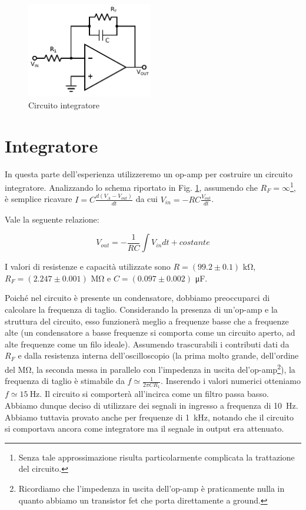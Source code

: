 \begin{figure}
	\includegraphics[width=55mm]{ccint.pdf}
	\caption{Circuito integratore}
	\label{fig:ccint}
\end{figure}

\section{Integratore}

In questa parte dell'esperienza utilizzeremo un op-amp per costruire un circuito integratore. Analizzando lo schema riportato in Fig. \ref{fig:ccint}, assumendo che $R_F=\infty$\footnote{Senza tale approssimazione risulta particolarmente complicata la trattazione del circuito.}, è semplice ricavare $I=C\frac{d(V_A-V_{out})}{dt}$ da cui $V_{in}=-RC\frac{V_{out}}{dt}$.

Vale la seguente relazione:%

\begin{equation}
V_{out}=-\frac{1}{RC} \int V_{in}dt +costante
\label{eq:int}
\end{equation}

I valori di resistenze e capacità utilizzate sono $R=(99.2 \pm 0.1)$ \si{\kilo\ohm},\\
$R_F=(2.247 \pm 0.001)$ \si{\mega\ohm} e $C=(0.097 \pm 0.002)$ \si{\micro\farad}. 

Poiché nel circuito è presente un condensatore, dobbiamo preoccuparci di calcolare la frequenza di taglio.
Considerando la presenza di un'op-amp e la struttura del circuito, esso funzionerà meglio a frequenze basse che a frequenze alte (un condensatore a basse frequenze si comporta come un circuito aperto, ad alte frequenze come un filo ideale).
Assumendo trascurabili i contributi dati da $R_F$ e dalla resistenza interna dell'oscilloscopio (la prima molto grande, dell'ordine del $\si{\mega\ohm}$, la seconda messa in parallelo con l'impedenza in uscita del'op-amp\footnote{Ricordiamo che l'impedenza in uscita dell'op-amp è praticamente nulla in quanto abbiamo un transistor fet che porta direttamente a ground.}), la frequenza di taglio è stimabile da $f\simeq \frac{1}{2\pi C R_1}$.
Inserendo i valori numerici otteniamo $f \simeq \SI{15}{\hertz}$.
Il circuito si comporterà all'incirca come un filtro passa basso.
Abbiamo dunque deciso di utilizzare dei segnali in ingresso a frequenza di \SI{10}{\hertz}.
Abbiamo tuttavia provato anche per frequenze di \SI{1}{\kilo\hertz}, notando che il circuito si comportava ancora come integratore ma il segnale in output era attenuato.

